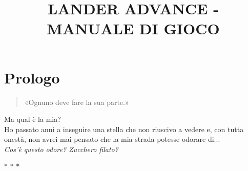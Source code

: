 \documentclass[9pt, twoside]{article}
\begin{document}
\title{\small LANDER ADVANCE - MANUALE DI GIOCO}
\author{}
\date{}
\maketitle
\newpage

\section{Prologo}
\begin{quote}\small
    «Ognuno deve fare la sua parte.»
\end{quote}
Ma qual è la mia? \\
Ho passato anni a inseguire una stella che non riuscivo a vedere e, con tutta onestà, non avrei mai pensato che la mia strada potesse odorare di... \\
\textit{Cos'è questo odore? Zucchero filato?}

\vspace{2mm}
\begin{center}
    $\ast$ \quad $\ast$ \quad $\ast$
\end{center}
\vspace{2mm}
\end{document}
